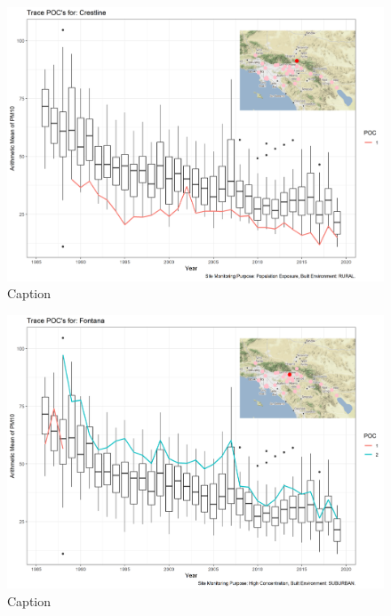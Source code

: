 \begin{figure}
    \centering
    \includegraphics[width = \textwidth]{Figures/IndividualSiteTraces/TracePOC_Crestline.png}
    \caption{Caption}
    \label{fig:my_label}
\end{figure}

\begin{figure}
    \centering
    \includegraphics[width = \textwidth]{Figures/IndividualSiteTraces/TracePOC_Fontana.png}
    \caption{Caption}
    \label{fig:my_label}
\end{figure}

